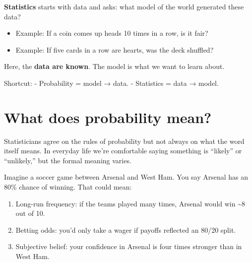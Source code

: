 \documentclass[
  letterpaper,
  DIV=11,
  numbers=noendperiod]{scrreprt}
\providecommand{\tightlist}{%
  \setlength{\itemsep}{0pt}\setlength{\parskip}{0pt}}
\begin{document}
\textbf{Statistics} starts with data and asks: what model of the world
generated these data?

\begin{itemize}
\tightlist
\item
  Example: If a coin comes up heads 10 times in a row, is it fair?
\item
  Example: If five cards in a row are hearts, was the deck shuffled?
\end{itemize}

Here, the \textbf{data are known}. The model is what we want to learn
about.

\begin{tcolorbox}[enhanced jigsaw, breakable, colback=white, opacitybacktitle=0.6, coltitle=black, toprule=.15mm, bottomtitle=1mm, leftrule=.75mm, arc=.35mm, title=\textcolor{quarto-callout-note-color}{\faInfo}\hspace{0.5em}{Note}, opacityback=0, colframe=quarto-callout-note-color-frame, left=2mm, titlerule=0mm, toptitle=1mm, colbacktitle=quarto-callout-note-color!10!white, rightrule=.15mm, bottomrule=.15mm]

Shortcut: - Probability = model → data. - Statistics = data → model.

\end{tcolorbox}

\section{What does probability mean?}\label{what-does-probability-mean}

Statisticians agree on the rules of probability but not always on what
the word itself means. In everyday life we're comfortable saying
something is ``likely'' or ``unlikely,'' but the formal meaning varies.

Imagine a soccer game between Arsenal and West Ham. You say Arsenal has
an 80\% chance of winning. That could mean:

\begin{enumerate}
\def\labelenumi{\arabic{enumi}.}
\item
  Long-run frequency: if the teams played many times, Arsenal would win
  \textasciitilde8 out of 10.
\item
  Betting odds: you'd only take a wager if payoffs reflected an 80/20
  split.
\item
  Subjective belief: your confidence in Arsenal is four times stronger
  than in West Ham.
\end{enumerate}
\end{document}
